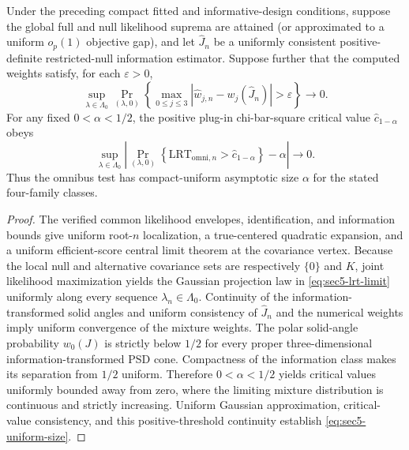 \begin{corollary}\label{cor:sec5-uniform-omnibus}
Under the preceding compact fitted and informative-design
conditions, suppose the global full and null likelihood suprema are
attained (or approximated to a uniform $o_p(1)$ objective gap),
and let $\widehat J_n$ be a uniformly consistent positive-definite
restricted-null information estimator. Suppose further that the
computed weights satisfy, for each $\varepsilon>0$,
\begin{equation}\label{eq:sec5-uniform-weights}
\sup_{\lambda\in\Lambda_0}
\Pr_{(\lambda,0)}\!\left\{
\max_{0\leq j\leq3}
\left|\widehat w_{j,n}-w_j(\widehat J_n)\right|
>\varepsilon\right\}\longrightarrow0.
\end{equation}
For any fixed $0<\alpha<1/2$, the positive plug-in
chi-bar-square critical value $\widehat c_{1-\alpha}$ obeys
\begin{equation}\label{eq:sec5-uniform-size}
\sup_{\lambda\in\Lambda_0}
\left|
\Pr_{(\lambda,0)}\!\left\{
\mathrm{LRT}_{\mathrm{omni},n}>
\widehat c_{1-\alpha}\right\}-\alpha
\right|\longrightarrow0.
\end{equation}
Thus the omnibus test has compact-uniform asymptotic size
$\alpha$ for the stated four-family classes.
\end{corollary}

\begin{proof}
The verified common likelihood envelopes, identification, and
information bounds give uniform root-$n$ localization, a
true-centered quadratic expansion, and a uniform efficient-score
central limit theorem at the covariance vertex. Because the local
null and alternative covariance sets are respectively $\{0\}$ and
$K$, joint likelihood maximization yields the Gaussian projection
law in \eqref{eq:sec5-lrt-limit} uniformly along every sequence
$\lambda_n\in\Lambda_0$. Continuity of the
information-transformed solid angles and uniform consistency of
$\widehat J_n$ and the numerical weights imply uniform convergence
of the mixture weights. The polar solid-angle probability
$w_0(J)$ is strictly below $1/2$ for every proper three-dimensional
information-transformed PSD cone. Compactness of the information
class makes its separation from $1/2$ uniform. Therefore
$0<\alpha<1/2$ yields critical values uniformly bounded away
from zero, where the limiting mixture distribution is continuous
and strictly increasing. Uniform Gaussian approximation, critical-
value consistency, and this positive-threshold continuity establish
\eqref{eq:sec5-uniform-size}.
\end{proof}

